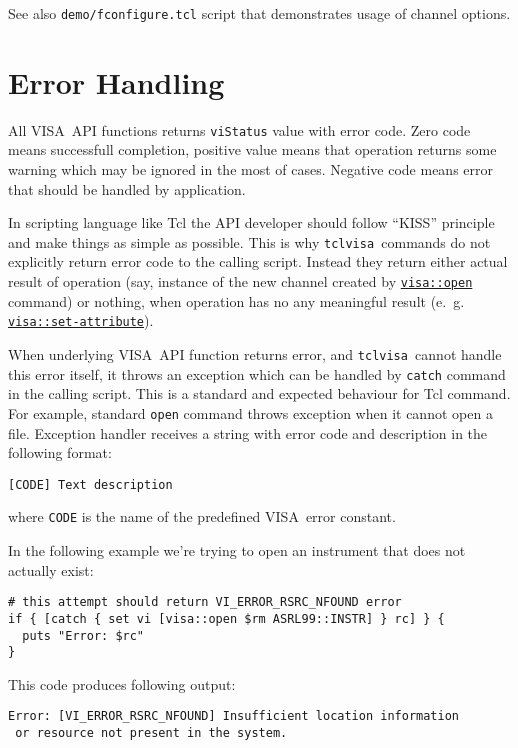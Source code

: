 \documentclass[12pt, a4paper]{report}
\newcommand{\tclvisa}{{\tt tclvisa }}
\newcommand{\VISA}{\mbox{VISA }}
\newcommand{\COMMANDREF}[1]{{\tt \hyperref[#1]{#1}}}
\newcommand{\TCLCOMMANDREF}[1]{{\tt \mbox{#1}}\index{#1}}
\begin{document}
See also {\tt demo/fconfigure.tcl} script that demonstrates usage of channel options.

\section{Error Handling}

All \VISA API functions returns {\tt viStatus} value with error code. Zero code means successfull completion, positive value means that operation returns some warning which may be ignored in the most of cases. Negative code means error that should be handled by application.

In scripting language like Tcl the API developer should follow ``KISS'' principle and make things as simple as possible. This is why \tclvisa commands do not explicitly return error code to the calling script. Instead they return either actual result of operation (say, instance of the new channel created by \COMMANDREF{visa::open} command) or nothing, when operation has no any meaningful result (e.~g. \COMMANDREF{visa::set-attribute}). 

When underlying \VISA API function returns error, and \tclvisa cannot handle this error itself, it throws an exception which can be handled by \TCLCOMMANDREF{catch} command in the calling script. This is a standard and expected behaviour for Tcl command. For example, standard \TCLCOMMANDREF{open} command throws exception when it cannot open a file. Exception handler receives a string with error code and description in the following format:

\begin{verbatim} 
[CODE] Text description
\end{verbatim} 

where {\tt CODE} is the name of the predefined \VISA error constant.

In the following example we're trying to open an instrument that does not actually exist:

\begin{verbatim} 
# this attempt should return VI_ERROR_RSRC_NFOUND error
if { [catch { set vi [visa::open $rm ASRL99::INSTR] } rc] } {
  puts "Error: $rc"
}
\end{verbatim} 

This code produces following output:

\begin{verbatim} 
Error: [VI_ERROR_RSRC_NFOUND] Insufficient location information
 or resource not present in the system.
\end{verbatim} 
\end{document}
